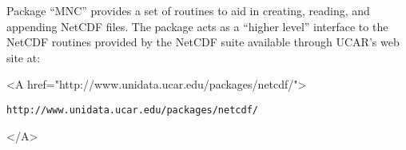 

Package ``MNC'' provides a set of routines to aid in creating,
reading, and appending NetCDF files.  The package acts as a ``higher
level'' interface to the NetCDF routines provided by the NetCDF suite
available through UCAR's web site at:

\begin{center}
\begin{rawhtml} <A href="http://www.unidata.ucar.edu/packages/netcdf/"> \end{rawhtml}
\begin{verbatim}
http://www.unidata.ucar.edu/packages/netcdf/
\end{verbatim}
\begin{rawhtml} </A> \end{rawhtml}
\end{center}

